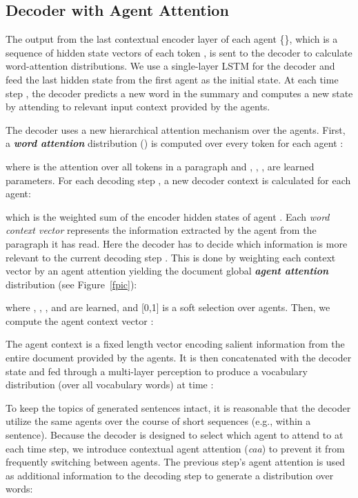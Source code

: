\documentclass[11pt,a4paper]{article}
\begin{document}
\subsection{Decoder with Agent Attention}
\label{uciki}
The output from the last contextual encoder layer of each agent \{\}, which is a sequence of hidden state vectors of each token , is sent to the decoder to calculate word-attention distributions. 
We use a single-layer LSTM for the decoder and feed the last hidden state from the first agent  as the initial state. 
At each time step , the decoder predicts a new word in the summary  and computes a new state  by attending to relevant input context provided by the agents.


The decoder uses a new hierarchical attention mechanism over the agents. First, 
a \textbf{\textit{word attention}} distribution  (\citet{bahdanau2014neural}) is computed over every token  for each agent :

where  is the attention over all tokens in a paragraph  and , , ,  are learned parameters.
For each decoding step , a new decoder context is calculated for each agent:

which is the weighted sum of the encoder hidden states of agent . 
Each \emph{word context vector} represents the information extracted by the agent from the paragraph it has read. 
Here the decoder has to decide which information is more relevant to the current decoding step . This is done by weighting each context vector by an agent attention yielding the document global \textbf{\textit{agent attention}} distribution  (see Figure~\ref{fpic}):

where , , , and  are learned, and [0,1] is a soft selection over  agents. 
Then, we compute the agent context vector :


\noindent The agent context  is a fixed length vector encoding salient information from the entire document provided by the agents. 
It is then concatenated with the decoder state  and fed through a multi-layer perception to produce a vocabulary distribution (over all vocabulary words) at time :

To keep the topics of generated sentences intact, it is reasonable that the decoder utilize the same agents over the course of short sequences (e.g., within a sentence).  
Because the decoder is designed to select which agent to attend to at each time step, we introduce contextual agent attention (\textit{caa}) to prevent it from frequently switching between agents. 
The previous step's agent attention  is used as additional information to the decoding step to generate a distribution over words:
\end{document}
